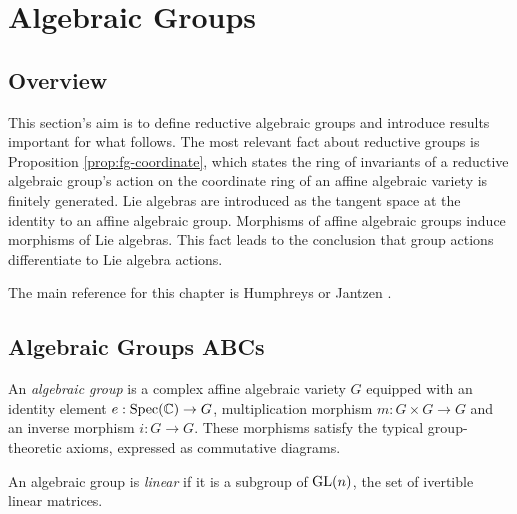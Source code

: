 \chapter{Algebraic Groups}

\section{Overview}
\label{sec:grp-motivation}

This section's aim is to define reductive algebraic groups and introduce results important for what follows. The most relevant fact about reductive groups is Proposition \ref{prop:fg-coordinate}, which states the ring of invariants of a reductive algebraic group's action on the coordinate ring of an affine algebraic variety is finitely generated. Lie algebras are introduced as the tangent space at the identity to an affine algebraic group. Morphisms of affine algebraic groups induce morphisms of Lie algebras. This fact leads to the conclusion that group actions differentiate to Lie algebra actions.

The main reference for this chapter is Humphreys \cite{MR0396773} or Jantzen \cite{MR2015057}.

\section{Algebraic Groups ABCs}
\label{sec:basics-of-groups}

\begin{definition}
  An \emph{algebraic group} is a complex affine algebraic variety $G$ equipped with an identity element $e: \operatorname{Spec}(\mathbb{C}) \to G$, multiplication morphism $m : G \times G \to G$ and an inverse morphism $i: G \to G$. These morphisms satisfy the typical group-theoretic axioms, expressed as commutative diagrams.

  An algebraic group is \emph{linear} if it is a subgroup of $\operatorname{GL}(n)$, the set of ivertible linear matrices.
\end{definition}

